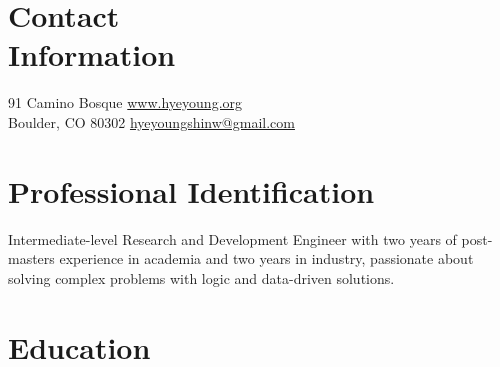 \documentclass[margin,line]{resume}
\begin{document}
\newcommand{\Hawaii}{Hawai\kern.05em`\kern.05em\relax i}
\newcommand{\Manoa}{M\=anoa}

\begin{resume}

    \section{\mysidestyle Contact\\Information}
     91 Camino Bosque              \hfill    \href{https://www.hyeyoung.org}{www.hyeyoung.org}\\
     Boulder, CO 80302             \hfill    \href{mailto:hyeyoungshinw@gmail.com}{hyeyoungshinw@gmail.com}

    \section{\mysidestyle Professional Identification}
    Intermediate-level Research and Development Engineer with two years of post-masters experience in academia and two years in industry, passionate about solving complex problems with logic and data-driven solutions.
    

    
    
    \section{\mysidestyle Education}


\end{resume}
\end{document}
